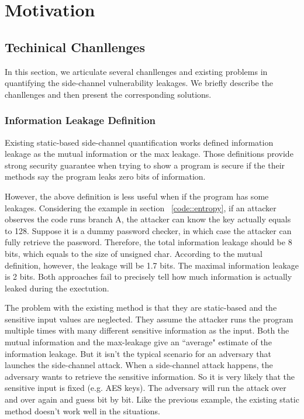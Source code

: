 \section{Motivation}
\subsection{Techinical Chanllenges}
In this section, we articulate several chanllenges and existing problems
in quantifying the side-channel vulnerability leakages. We briefly describe the
chanllenges and then present the corresponding solutions.

\subsubsection{Information Leakage Definition}
Existing static-based side-channel quantification works defined information leakage
as the mutual information or the max leakage. Those definitions provide strong security guarantee
when trying to show a program is secure if the their methods say the program leaks zero bits of
information.

However, the above definition is less useful when if the program has some leakages. 
Considering the example in section ~\ref{code::entropy}, if an attacker observes the
code runs branch A, the attacker can know the key actually equals to 128. Suppose it is 
a dummy password checker, in which case the attacker can fully retrieve the password.
Therefore, the total information leakage should be 8 bits, which equals to the size
of unsigned char. 
According to the mutual definition, however, the leakage will be 1.7 bits. The maximal information
leakage is 2 bits. Both approaches fail to precisely tell how much information is actually leaked
during the exectution.

The problem with the existing method is that they are static-based and the sensitive
input values are neglected. They assume the attacker runs the program multiple times 
with many different sensitive information as the input. Both the mutual information 
and the max-leakage give an ``average" estimate of the information leakage. 
But it isn't the typical scenario for an adversary that launches the side-channel attack.
When a side-channel attack happens, the adversary wants to retrieve the sensitive
information. So it is very likely that the sensitive input is fixed (e.g. AES keys). 
The adversary will run the attack over and over again and guess bit by bit. Like the 
previous example, the existing static method doesn’t work well in the situations.

